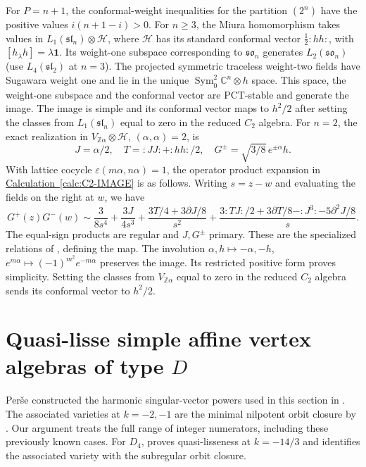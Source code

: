 \documentclass[11pt,a4paper]{amsart}
\numberwithin{equation}{section}
\theoremstyle{definition}
\theoremstyle{remark}
\newcommand{\C}{\mathbb C}
\newcommand{\Z}{\mathbb Z}
\newcommand{\sog}{\mathfrak{so}}
\newcommand{\slg}{\mathfrak{sl}}
\newcommand{\Sym}{\operatorname{Sym}}
\begin{document}
For $P=n+1$, the conformal-weight inequalities for the partition
$(2^n)$ have the positive values $i(n+1-i)>0$.
For $n\ge3$, the Miura homomorphism takes values in
$L_1(\slg_n)\otimes\mathcal H$, where $\mathcal H$ has its standard conformal vector $\tfrac12:hh:$,
with $[h_\lambda h]=\lambda\mathbf1$. Its
weight-one subspace corresponding to $\sog_n$ generates $L_2(\sog_n)$ (use $L_4(\slg_2)$ at
$n=3$). The projected symmetric traceless weight-two fields have
Sugawara weight one and lie in the unique
$\Sym^2_0\C^n\otimes h$ space. This space, the weight-one subspace and the conformal vector
are PCT-stable and generate the image. The image is simple and its
conformal vector maps to $h^2/2$ after setting the classes from
$L_1(\slg_n)$ equal to zero in the reduced $C_2$ algebra.
For $n=2$, the exact realization in $V_{\Z\alpha}\otimes\mathcal H$,
$(\alpha,\alpha)=2$, is
$$
 J=\alpha/2,\quad T=:JJ:+:hh:/2,\quad
 G^\pm=\sqrt{3/8}\,e^{\pm\alpha}h.
$$
With lattice cocycle $\varepsilon(m\alpha,n\alpha)=1$, the operator
product expansion in \hyperref[calc:C2-IMAGE]{Calculation~\ref*{calc:C2-IMAGE}} is
as follows. Writing $s=z-w$ and evaluating the fields on the right at $w$, we have
$$
G^+(z)G^-(w)\sim\frac{3}{8s^4}+\frac{3J}{4s^3}
+\frac{3T/4+3\partial J/8}{s^2}
+\frac{3:TJ:/2+3\partial T/8-:J^3:-5\partial^2J/8}{s}.
$$
The equal-sign products are regular and $J,G^\pm$ primary. These are
the specialized relations of \cite[Section~5]{Fasquel2022}, defining the map. The involution
$\alpha,h\mapsto-\alpha,-h$, $e^{m\alpha}\mapsto(-1)^{m^2}e^{-m\alpha}$
preserves the image. Its restricted positive form proves simplicity.
Setting the classes from $V_{\Z\alpha}$ equal to zero in the reduced
$C_2$ algebra sends its conformal vector to $h^2/2$.


\section{\texorpdfstring{Quasi-lisse simple affine vertex algebras of type $D$}{Quasi-lisse simple affine vertex algebras of type D}}\label{sec:type-D}

Per\v se constructed the harmonic singular-vector powers used in
this section in \cite[Theorem~3.1]{PerseD2013}. The associated
varieties at $k=-2,-1$ are the minimal nilpotent orbit closure by
\cite[Theorem~1.1]{ArakawaMoreau2018}. Our argument treats the full
range of integer numerators, including these previously known cases.
For $D_4$, \cite{AVD42026} proves quasi-lisseness at $k=-14/3$ and identifies the associated variety with the subregular orbit closure.
\end{document}
